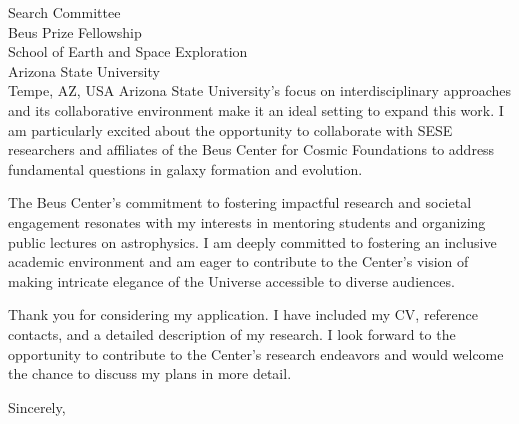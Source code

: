 \documentclass[11pt]{letter}
\begin{document}
\begin{letter}{Search Committee \\ Beus Prize Fellowship \\ School of Earth and Space Exploration \\ Arizona State University \\ Tempe, AZ, USA}
Arizona State University's focus on interdisciplinary approaches and its collaborative environment make it an ideal setting to expand this work. I am particularly excited about the opportunity to collaborate with SESE researchers and affiliates of the Beus Center for Cosmic Foundations to address fundamental questions in galaxy formation and evolution.

The Beus Center's commitment to fostering impactful research and societal engagement resonates with my interests in mentoring students and organizing public lectures on astrophysics. I am deeply committed to fostering an inclusive academic environment and am eager to contribute to the Center's vision of making intricate elegance of the Universe accessible to diverse audiences.

Thank you for considering my application. I have included my CV, reference contacts, and a detailed description of my research. I look forward to the opportunity to contribute to the Center's research endeavors and would welcome the chance to discuss my plans in more detail.

\closing{Sincerely,}

\end{letter}
\end{document}
